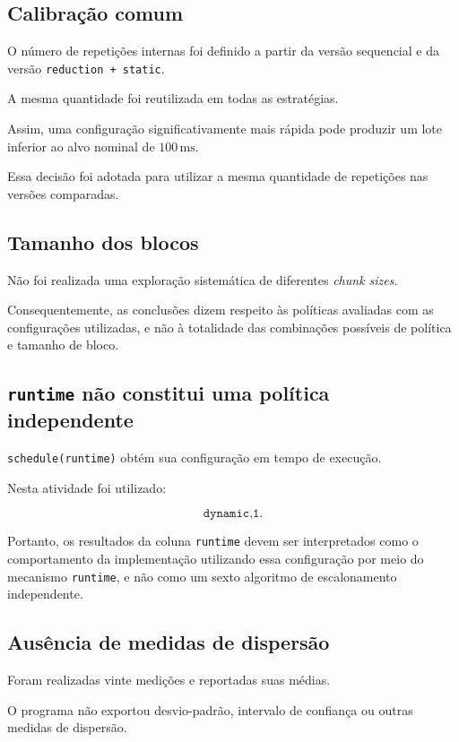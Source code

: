 \subsection{Calibração comum}

O número de repetições internas foi definido a partir da versão sequencial e
da versão \texttt{reduction + static}.

A mesma quantidade foi reutilizada em todas as estratégias.

Assim, uma configuração significativamente mais rápida pode produzir um
lote inferior ao alvo nominal de \(100\,\mathrm{ms}\).

Essa decisão foi adotada para utilizar a mesma quantidade de repetições nas
versões comparadas.


\subsection{Tamanho dos blocos}

Não foi realizada uma exploração sistemática de diferentes
\textit{chunk sizes}.

Consequentemente, as conclusões dizem respeito às políticas avaliadas com
as configurações utilizadas, e não à totalidade das combinações possíveis
de política e tamanho de bloco.


\subsection{\texttt{runtime} não constitui uma política independente}

\texttt{schedule(runtime)} obtém sua configuração em tempo de execução.

Nesta atividade foi utilizado:

\[
\texttt{dynamic,1}.
\]

Portanto, os resultados da coluna \texttt{runtime} devem ser interpretados
como o comportamento da implementação utilizando essa configuração por meio
do mecanismo \texttt{runtime}, e não como um sexto algoritmo de
escalonamento independente.


\subsection{Ausência de medidas de dispersão}

Foram realizadas vinte medições e reportadas suas médias.

O programa não exportou desvio-padrão, intervalo de confiança ou outras
medidas de dispersão.

